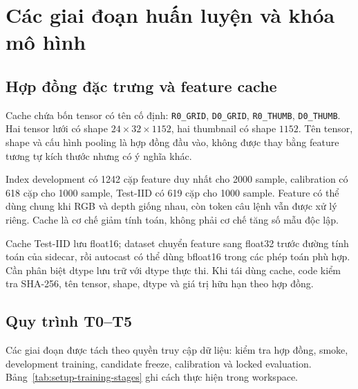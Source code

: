 \section{Các giai đoạn huấn luyện và khóa mô hình}
\label{sec:setup-training}

\subsection{Hợp đồng đặc trưng và feature cache}

Cache chứa bốn tensor có tên cố định:
\texttt{R0\_\allowbreak GRID}, \texttt{D0\_\allowbreak GRID},
\texttt{R0\_\allowbreak THUMB}, \texttt{D0\_\allowbreak THUMB}.
Hai tensor lưới có shape $24\times32\times1152$,
hai thumbnail có shape $1152$.
Tên tensor, shape và cấu hình pooling là hợp đồng đầu
vào, không được thay bằng feature tương tự kích thước
nhưng có ý nghĩa khác.

Index development có 1242 cặp feature duy nhất cho
2000 sample, calibration có 618 cặp cho 1000 sample,
Test-IID có 619 cặp cho 1000 sample.
Feature có thể dùng chung khi RGB và depth giống nhau,
còn token câu lệnh vẫn được xử lý riêng.
Cache là cơ chế giảm tính toán, không phải cơ chế tăng
số mẫu độc lập.

Cache Test-IID lưu float16; dataset chuyển feature
sang float32 trước đường tính toán của sidecar, rồi
autocast có thể dùng bfloat16 trong các phép toán phù
hợp. Cần phân biệt dtype lưu trữ với dtype thực thi.
Khi tái dùng cache, code kiểm tra SHA-256, tên tensor,
shape, dtype và giá trị hữu hạn theo hợp đồng.

\subsection{Quy trình T0--T5}

Các giai đoạn được tách theo quyền truy cập dữ liệu:
kiểm tra hợp đồng, smoke, development training,
candidate freeze, calibration và locked evaluation.
Bảng~\ref{tab:setup-training-stages} ghi cách thực hiện
trong workspace.

